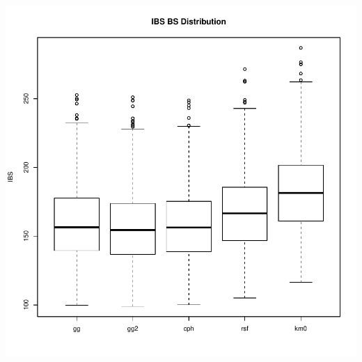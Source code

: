 \documentclass{article}\usepackage[]{graphicx}\usepackage[]{color}
\makeatletter
\def\maxwidth{ %
  \ifdim\Gin@nat@width>\linewidth
    \linewidth
  \else
    \Gin@nat@width
  \fi
}
\newenvironment{knitrout}{}{} %
\makeatother
\begin{document}
\begin{knitrout}
{\centering \includegraphics[width=\maxwidth]{figure/model-selection-ibs-1} 

}



\end{knitrout}
\end{document}
